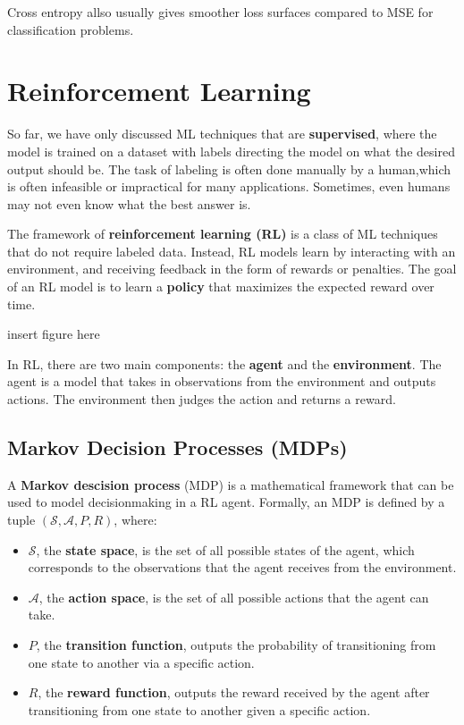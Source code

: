 \documentclass[12pt]{report}
\theoremstyle{definition}
\theoremstyle{remark}
\begin{document}
Cross entropy allso usually gives smoother loss surfaces compared to MSE for classification problems.

\chapter{Reinforcement Learning}
So far, we have only discussed ML techniques that are \textbf{supervised}, where the model is trained on a dataset with labels directing the model on what the desired output should be. The task of labeling is often done manually by a human,which is often infeasible or impractical for many applications. Sometimes, even humans may not even know what the best answer is.

The framework of \textbf{reinforcement learning (RL)} is a class of ML techniques that do not require labeled data. Instead, RL models learn by interacting with an environment, and receiving feedback in the form of rewards or penalties. The goal of an RL model is to learn a \textbf{policy} that maximizes the expected reward over time.

insert figure here

In RL, there are two main components: the \textbf{agent} and the \textbf{environment}. The agent is a model that takes in observations from the environment and outputs actions.  The environment then judges the action and returns a reward.

\section{Markov Decision Processes (MDPs)}

A \textbf{Markov descision process} (MDP) is a mathematical framework that can be used to model decisionmaking in a RL agent. Formally, an MDP is defined by a tuple $(\mathcal{S}, \mathcal{A}, P, R)$, where:
\begin{itemize}
    \item $\mathcal{S}$, the \textbf{state space}, is the set of all possible states of the agent, which corresponds to the observations that the agent receives from the environment.
    \item $\mathcal{A}$, the \textbf{action space}, is the set of all possible actions that the agent can take.
    \item $P$, the \textbf{transition function}, outputs the probability of transitioning from one state to another via a specific action.
    \item $R$, the \textbf{reward function}, outputs the reward received by the agent after transitioning from one state to another given a specific action.
\end{itemize}
\end{document}
